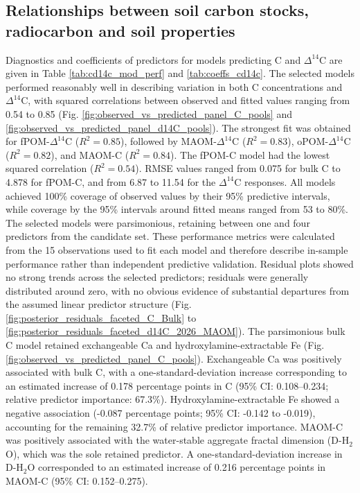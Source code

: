 \documentclass[preprint,12pt]{elsarticle}
\begin{document}
\subsection{Relationships between soil carbon stocks, radiocarbon and soil properties}
\label{subsec:carbon_fractions}
  Diagnostics and coefficients of predictors for models predicting C and $\Delta^{14}$C are given in Table \ref{tab:cd14c_mod_perf} and \ref{tab:coeffs_cd14c}.
  The selected models performed reasonably well in describing variation in both C concentrations and $\Delta^{14}$C, with squared correlations between observed and fitted values ranging from 0.54 to 0.85 (Fig. \ref{fig:observed_vs_predicted_panel_C_pools} and \ref{fig:observed_vs_predicted_panel_d14C_pools}). The strongest fit was obtained for fPOM-$\Delta^{14}$C ($R^2=0.85$), followed by MAOM-$\Delta^{14}$C ($R^2=0.83$), oPOM-$\Delta^{14}$C ($R^2=0.82$), and MAOM-C ($R^2=0.84$). The fPOM-C model had the lowest squared correlation ($R^2=0.54$). RMSE values ranged from 0.075 for bulk C to 4.878 for fPOM-C, and from 6.87 to 11.54 for the $\Delta^{14}$C responses. All models achieved 100\% coverage of observed values by their 95\% predictive intervals, while coverage by the 95\% intervals around fitted means ranged from 53 to 80\%. The selected models were parsimonious, retaining between one and four predictors from the candidate set. These performance metrics were calculated from the 15 observations used to fit each model and therefore describe in-sample performance rather than independent predictive validation. Residual plots showed no strong trends across the selected predictors; residuals were generally distributed around zero, with no obvious evidence of substantial departures from the assumed linear predictor structure (Fig. \ref{fig:posterior_residuals_faceted_C_Bulk} to \ref{fig:posterior_residuals_faceted_d14C_2026_MAOM}).
  The parsimonious bulk C model retained exchangeable Ca and hydroxylamine-extractable Fe (Fig. \ref{fig:observed_vs_predicted_panel_C_pools}). Exchangeable Ca was positively associated with bulk C, with a one-standard-deviation increase corresponding to an estimated increase of 0.178 percentage points in C (95\% CI: 0.108–0.234; relative predictor importance: 67.3\%). Hydroxylamine-extractable Fe showed a negative association (-0.087 percentage points; 95\% CI: -0.142 to -0.019), accounting for the remaining 32.7\% of relative predictor importance.
  MAOM-C was positively associated with the water-stable aggregate fractal dimension (D-H$_2$O), which was the sole retained predictor. A one-standard-deviation increase in D-H$_2$O corresponded to an estimated increase of 0.216 percentage points in MAOM-C (95\% CI: 0.152–0.275).
\end{document}
